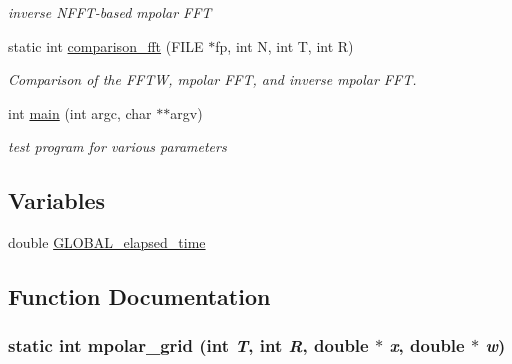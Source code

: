\begin{CompactItemize}
\begin{CompactList}\small\item\em inverse NFFT-based mpolar FFT \item\end{CompactList}\item 
\hypertarget{group__applications__polarFFT__mpolar_g522ff84df31c08a1f237ad0ec7ce4ac5}{
static int \hyperlink{group__applications__polarFFT__mpolar_g522ff84df31c08a1f237ad0ec7ce4ac5}{comparison\_\-fft} (FILE $\ast$fp, int N, int T, int R)}
\label{group__applications__polarFFT__mpolar_g522ff84df31c08a1f237ad0ec7ce4ac5}

\begin{CompactList}\small\item\em Comparison of the FFTW, mpolar FFT, and inverse mpolar FFT. \item\end{CompactList}\item 
\hypertarget{group__applications__polarFFT__mpolar_g3c04138a5bfe5d72780bb7e82a18e627}{
int \hyperlink{group__applications__polarFFT__mpolar_g3c04138a5bfe5d72780bb7e82a18e627}{main} (int argc, char $\ast$$\ast$argv)}
\label{group__applications__polarFFT__mpolar_g3c04138a5bfe5d72780bb7e82a18e627}

\begin{CompactList}\small\item\em test program for various parameters \item\end{CompactList}\end{CompactItemize}
\subsection*{Variables}
\begin{CompactItemize}
\item 
\hypertarget{group__applications__polarFFT__mpolar_g89f1a3516fab4c4d4d274df955af639b}{
double \hyperlink{group__applications__polarFFT__mpolar_g89f1a3516fab4c4d4d274df955af639b}{GLOBAL\_\-elapsed\_\-time}}
\label{group__applications__polarFFT__mpolar_g89f1a3516fab4c4d4d274df955af639b}

\end{CompactItemize}


\subsection{Function Documentation}
\hypertarget{group__applications__polarFFT__mpolar_g08d0441aceedbcb98b985ee5aa121952}{
\subsubsection{\setlength{\rightskip}{0pt plus 5cm}static int mpolar\_\-grid (int {\em T}, int {\em R}, double $\ast$ {\em x}, double $\ast$ {\em w})}}
\label{group__applications__polarFFT__mpolar_g08d0441aceedbcb98b985ee5aa121952}


